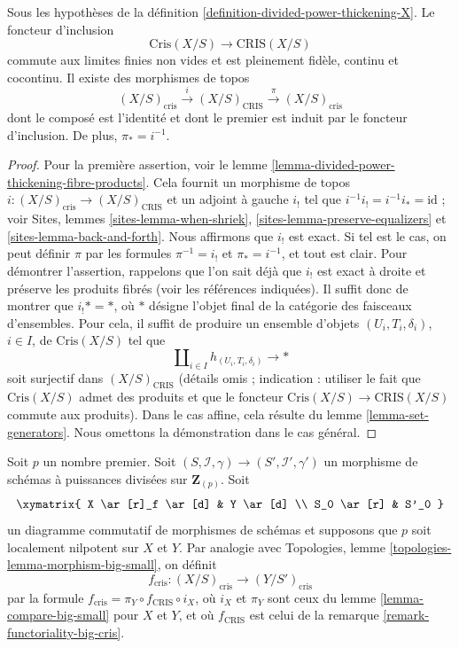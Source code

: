 \begin{lemma}
\label{lemma-compare-big-small}
Sous les hypothèses de la définition \ref{definition-divided-power-thickening-X}.
Le foncteur d'inclusion
$$
\text{Cris}(X/S) \to \text{CRIS}(X/S)
$$
commute aux limites finies non vides et est pleinement fidèle, continu
et cocontinu. Il existe des morphismes de topos
$$
(X/S)_{\text{cris}} \xrightarrow{i} (X/S)_{\text{CRIS}}
\xrightarrow{\pi} (X/S)_{\text{cris}}
$$
dont le composé est l'identité et dont le premier est induit
par le foncteur d'inclusion. De plus, $\pi_* = i^{-1}$.
\end{lemma}

\begin{proof}
Pour la première assertion, voir le
lemme \ref{lemma-divided-power-thickening-fibre-products}.
Cela fournit un morphisme de topos
$i : (X/S)_{\text{cris}} \to (X/S)_{\text{CRIS}}$ et un adjoint à gauche
$i_!$ tel que $i^{-1}i_! = i^{-1}i_* = \text{id}$ ; voir
Sites, lemmes \ref{sites-lemma-when-shriek},
\ref{sites-lemma-preserve-equalizers} et
\ref{sites-lemma-back-and-forth}.
Nous affirmons que $i_!$ est exact. Si tel est le cas, on peut définir
$\pi$ par les formules $\pi^{-1} = i_!$ et $\pi_* = i^{-1}$,
et tout est clair. Pour démontrer l'assertion, rappelons que l'on sait déjà
que $i_!$ est exact à droite et préserve les produits fibrés (voir les références
indiquées). Il suffit donc de montrer que $i_! * = *$, où $*$ désigne
l'objet final de la catégorie des faisceaux d'ensembles.
Pour cela, il suffit de produire un ensemble d'objets
$(U_i, T_i, \delta_i)$, $i \in I$, de $\text{Cris}(X/S)$ tel que
$$
\coprod\nolimits_{i \in I} h_{(U_i, T_i, \delta_i)} \to *
$$
soit surjectif dans $(X/S)_{\text{CRIS}}$ (détails omis ; indication : utiliser le fait que
$\text{Cris}(X/S)$ admet des produits et que le foncteur
$\text{Cris}(X/S) \to \text{CRIS}(X/S)$ commute aux produits).
Dans le cas affine, cela
résulte du lemme \ref{lemma-set-generators}. Nous omettons la démonstration
dans le cas général.
\end{proof}

\begin{remark}[Fonctorialité]
\label{remark-functoriality-cris}
Soit $p$ un nombre premier.
Soit $(S, \mathcal{I}, \gamma) \to (S', \mathcal{I}', \gamma')$
un morphisme de schémas à puissances divisées sur $\mathbf{Z}_{(p)}$.
Soit
$$
\xymatrix{
X \ar[r]_f \ar[d] & Y \ar[d] \\
S_0 \ar[r] & S'_0
}
$$
un diagramme commutatif de morphismes de schémas et supposons que $p$ soit
localement nilpotent sur $X$ et $Y$. Par analogie avec
Topologies, lemme \ref{topologies-lemma-morphism-big-small}, on définit
$$
f_{\text{cris}} : (X/S)_{\text{cris}} \longrightarrow (Y/S')_{\text{cris}}
$$
par la formule $f_{\text{cris}} = \pi_Y \circ f_{\text{CRIS}} \circ i_X$,
où $i_X$ et $\pi_Y$ sont ceux du lemme \ref{lemma-compare-big-small}
pour $X$ et $Y$, et où $f_{\text{CRIS}}$ est celui de la
remarque \ref{remark-functoriality-big-cris}.
\end{remark}

